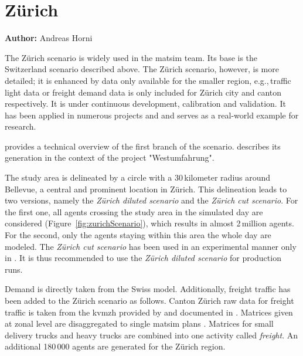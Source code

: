 \section{Zürich}
\label{sec:zhscenario}
\hfill \textbf{Author:} Andreas Horni

The Zürich scenario is widely used in the \gls{matsim} team. Its base is the Switzerland scenario described above. The Zürich scenario, however, is more detailed; it is enhanced by data only available for the smaller region, e.g.,\,traffic light data or freight demand data is only included for Zürich city and canton respectively. It is under continuous development, calibration and validation. It has been applied in numerous projects and and serves as a real-world example for research.   

\citet{HorniEtAl_TechRep_IVT_2011_a} provides a technical overview of the first branch of the scenario. \citet[][]{BalmerEtAl_ResRep_bdktzrh_2009} describes its generation in the context of the project "Westumfahrung". 

The study area is delineated by a circle with a 30\,kilometer radius around Bellevue, a central and prominent location in Zürich. This delineation leads to two versions, namely the \emph{Zürich diluted scenario} and the \emph{Zürich cut scenario}. For the first one, all agents crossing the study area in the simulated day are considered (Figure~\ref{fig:zurichScenario}), which results in almost 2\,million agents. For the second, only the agents staying within this area the whole day are modeled. The \emph{Zürich cut scenario} has been used in an experimental manner only in \citet[][]{Hackney_PhDThesis_2009}. It is thus recommended to use the \emph{Zürich diluted scenario} for production runs.

Demand is directly taken from the Swiss model. Additionally, freight traffic has been added to the Zürich scenario as follows. Canton Zürich raw data for freight traffic is taken from the \gls{kvmzh} provided by \citet{AMV_Webpage_2011} and documented in \citet[][]{GottardiBuergler_SV_1999}. Matrices given at zonal level are disaggregated to single \gls{matsim} plans \citep[][]{ShahM_TechRep_IVT_2010}. Matrices for small delivery trucks and heavy trucks are combined into one activity called \emph{freight}. An additional 180\,000 agents are generated for the Zürich region.

